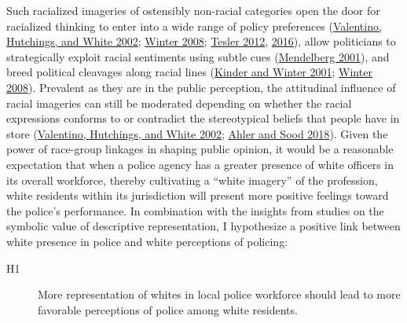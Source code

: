 \documentclass[
  12pt,
]{article}
\begin{document}
Such racialized imageries of ostensibly non-racial categories open the
door for racialized thinking to enter into a wide range of policy
preferences (\protect\hyperlink{ref-valentino2002}{Valentino, Hutchings,
and White 2002}; \protect\hyperlink{ref-winter2008}{Winter 2008};
\protect\hyperlink{ref-tesler2012}{Tesler 2012},
\protect\hyperlink{ref-tesler2016}{2016}), allow politicians to
strategically exploit racial sentiments using subtle cues
(\protect\hyperlink{ref-mendelberg2001}{Mendelberg 2001}), and breed
political cleavages along racial lines
(\protect\hyperlink{ref-kinder2001}{Kinder and Winter 2001};
\protect\hyperlink{ref-winter2008}{Winter 2008}). Prevalent as they are
in the public perception, the attitudinal influence of racial imageries
can still be moderated depending on whether the racial expressions
conforms to or contradict the stereotypical beliefs that people have in
store (\protect\hyperlink{ref-valentino2002}{Valentino, Hutchings, and
White 2002}; \protect\hyperlink{ref-ahler2018}{Ahler and Sood 2018}).
Given the power of race-group linkages in shaping public opinion, it
would be a reasonable expectation that when a police agency has a
greater presence of white officers in its overall workforce, thereby
cultivating a ``white imagery'' of the profession, white residents
within its jurisdiction will present more positive feelings toward the
police's performance. In combination with the insights from studies on
the symbolic value of descriptive representation, I hypothesize a
positive link between white presence in police and white perceptions of
policing:

\begin{description}
\item[H1]
More representation of whites in local police workforce should lead to
more favorable perceptions of police among white residents.
\end{description}
\end{document}
